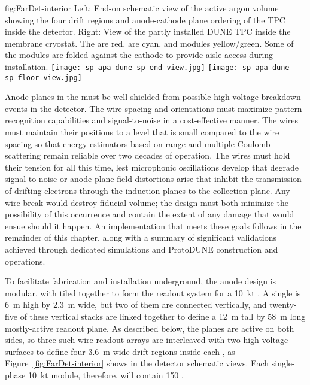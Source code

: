 \begin{dunefigure}{fig:FarDet-interior}
{Left: End-on schematic view of the active argon volume showing the four drift regions and anode-cathode plane ordering of the TPC inside the detector. Right: View of the partly installed DUNE TPC inside the membrane cryostat. The  are red,  are cyan, and  modules yellow/green.  Some of the  modules are folded against the cathode to provide aisle access during installation.}
\texttt{[image: sp-apa-dune-sp-end-view.jpg]}\hspace{0.01\textwidth}
\texttt{[image: sp-apa-dune-sp-floor-view.jpg]}
\end{dunefigure}

Anode planes in the  must be well-shielded from possible high voltage breakdown events in the detector.  The  wire spacing and orientations must maximize pattern recognition capabilities and signal-to-noise in a cost-effective manner.  The  wires must maintain their positions to a level that is small compared to the wire spacing so that energy estimators based on range and multiple Coulomb scattering remain reliable over two decades of operation.  The wires must hold their tension for all this time, lest microphonic oscillations develop that degrade signal-to-noise or anode plane field distortions arise that inhibit the transmission of drifting electrons through the induction planes to the collection plane.  Any wire break would destroy fiducial volume; the  design must both minimize the possibility of this occurrence and contain the extent of any damage that would ensue should it happen.  An  implementation that meets these goals follows in the remainder of this chapter, along with a summary of significant validations achieved through dedicated simulations and ProtoDUNE construction and operations.

To facilitate fabrication and installation underground, the anode design is modular, with  tiled together to form the readout system for a \SI{10}{kt} . A single  is \SI{6}{m} high by \SI{2.3}{m} wide, but two of them are connected vertically, and twenty-five of these vertical stacks are linked together to define a \SI{12}{m} tall by \SI{58}{m} long mostly-active readout plane.  As described below, the planes are active on both sides, so three such wire readout arrays are interleaved with two high voltage surfaces to define four \SI{3.6}{m} wide drift regions inside each , as Figure~\ref{fig:FarDet-interior} shows in the detector schematic views. Each single-phase \SI{10}{kt} module, therefore, will contain 150 .


